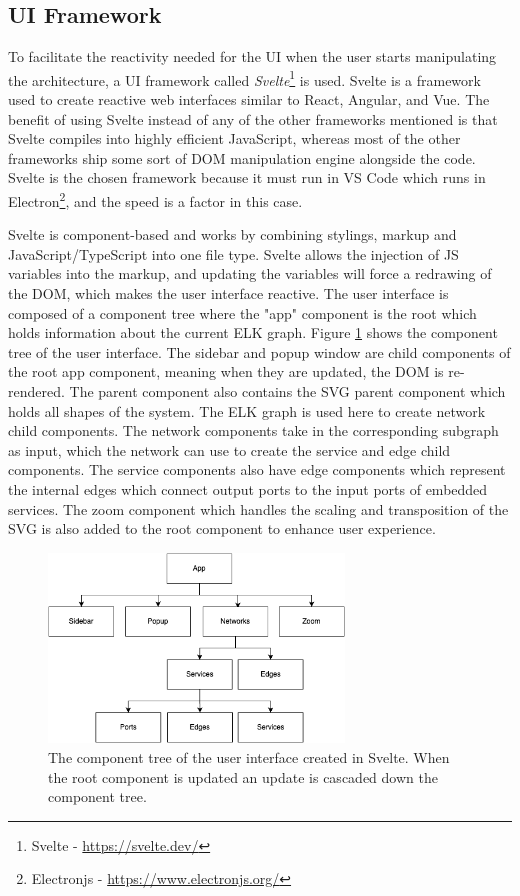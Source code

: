 \subsection{UI Framework}
To facilitate the reactivity needed for the UI when the user starts manipulating the architecture, a UI framework called \textit{Svelte}\footnote{Svelte - \url{https://svelte.dev/}} is used.
Svelte is a framework used to create reactive web interfaces similar to React, Angular, and Vue. The benefit of using Svelte instead of any of the other frameworks mentioned is that Svelte compiles into highly efficient JavaScript,
whereas most of the other frameworks ship some sort of DOM manipulation engine alongside the code. Svelte is the chosen framework because it must run in VS Code which runs in Electron\footnote{Electronjs - \url{https://www.electronjs.org/}}, and the speed is a factor in this case.

Svelte is component-based and works by combining stylings, markup and JavaScript/TypeScript into one file type. Svelte allows the injection of JS variables into the markup, and updating the variables will force a redrawing of the DOM, which makes the user interface reactive.
The user interface is composed of a component tree where the "app" component is the root which holds information about the current ELK graph. Figure \ref*{figure:component_tree} shows the component tree of the user interface. The sidebar and popup window are child components of the root app component, meaning when they are updated, the DOM is re-rendered. 
The parent component also contains the SVG parent component which holds all shapes of the system.
The ELK graph is used here to create network child components. The network components take in the corresponding subgraph as input, which the network can use to create the service and edge child components.
The service components also have edge components which represent the internal edges which connect output ports to the input ports of embedded services.
The zoom component which handles the scaling and transposition of the SVG is also added to the root component to enhance user experience.

\begin{figure}[h!]
    \center
    \includegraphics[width=0.70\textwidth]{figures/component_tree.png}
    \caption{The component tree of the user interface created in Svelte. When the root component is updated an update is cascaded down the component tree.}
    \label{figure:component_tree}
\end{figure}

